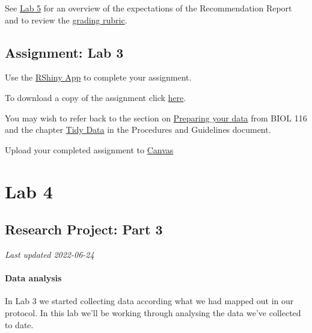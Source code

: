 \documentclass[
]{book}
\begin{document}
See \href{https://ubco-biology.github.io/BIOL-125-Lab-Manual-Summer/recommendation-report.html}{Lab 5} for an overview of the expectations of the Recommendation Report and to review the \href{https://ubco-biology.github.io/BIOL-125-Lab-Manual-Summer/rubric-lab-5.html}{grading rubric}.

\hypertarget{assignment-lab-3}{%
\chapter*{Assignment: Lab 3}\label{assignment-lab-3}}

Use the \href{https://openscience.ok.ubc.ca/shiny/BIOL-116/}{RShiny App} to complete your assignment.

To download a copy of the assignment click \href{files/Lab_3_RShiny_Assignment_2.pdf}{here}.

You may wish to refer back to the section on \href{https://ubco-biology.github.io/BIOL-116-Lab-Manual/preparing-your-data.html}{Preparing your data} from BIOL 116 and the chapter \href{https://ubco-biology.github.io/Procedures-and-Guidelines/tidy-data.html}{Tidy Data} in the Procedures and Guidelines document.

Upload your completed assignment to \href{https://canvas.ubc.ca/}{Canvas}

\hypertarget{part-lab-4}{%
\part*{Lab 4}\label{part-lab-4}}

\hypertarget{research-project-part-3}{%
\chapter*{Research Project: Part 3}\label{research-project-part-3}}

\emph{Last updated 2022-06-24}

\hypertarget{data-analysis}{%
\subsection*{Data analysis}\label{data-analysis}}

In Lab 3 we started collecting data according what we had mapped out in our protocol. In this lab we'll be working through analysing the data we've collected to date.
\end{document}
